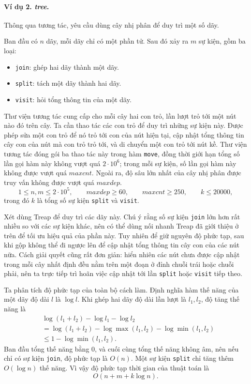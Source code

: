 \documentclass[11pt]{article}
\begin{document}
\paragraph{Ví dụ 2. \emph{tree}.}
Thông qua tương tác, yêu cầu dùng cây nhị phân để duy trì một số dãy.

Ban đầu có \(n\) dãy, mỗi dãy chỉ có một phần tử. Sau đó xảy ra \(m\) sự kiện,
gồm ba loại:

\begin{itemize}
  \item \texttt{join}: ghép hai dãy thành một dãy.
  \item \texttt{split}: tách một dãy thành hai dãy.
  \item \texttt{visit}: hỏi tổng thông tin của một dãy.
\end{itemize}

Thư viện tương tác cung cấp cho mỗi cây hai con trỏ, lần lượt trỏ tới một nút
nào đó trên cây. Ta cần thao tác các con trỏ để duy trì những sự kiện này. Được
phép sửa một con trỏ để nó trỏ tới con của nút hiện tại, cập nhật tổng thông
tin cây con của nút mà con trỏ trỏ tới, và di chuyển một con trỏ tới nút kề.
Thư viện tương tác đóng gói ba thao tác này trong hàm \texttt{move}, đồng thời
giới hạn tổng số lần gọi hàm này không vượt quá \(2\cdot 10^6\); trong mỗi sự
kiện, số lần gọi hàm này không được vượt quá \(\textit{maxcnt}\). Ngoài ra,
độ sâu lớn nhất của cây nhị phân được truy vấn không được vượt quá
\(\textit{maxdep}\).
\[
  1\le n,m\le 2\cdot 10^5,\qquad
  \textit{maxdep}\ge 60,\qquad
  \textit{maxcnt}\ge 250,\qquad
  k\le 20000,
\]
trong đó \(k\) là tổng số sự kiện \texttt{split} và \texttt{visit}.

Xét dùng Treap để duy trì các dãy này. Chú ý rằng số sự kiện \texttt{join} lớn
hơn rất nhiều so với các sự kiện khác, nên có thể dùng nối nhanh Treap đã giới
thiệu ở trên để tối ưu hiệu quả của phần này. Tuy nhiên để giữ nguyên độ phức
tạp, sau khi gộp không thể đi ngược lên để cập nhật tổng thông tin cây con của
các nút nữa. Cách giải quyết cũng rất đơn giản: hiển nhiên các nút chưa được
cập nhật trong mỗi cây nhất định đều nằm trên một đoạn ở đỉnh chuỗi trái hoặc
chuỗi phải, nên ta trực tiếp trì hoãn việc cập nhật tới lần \texttt{split} hoặc
\texttt{visit} tiếp theo.

Ta phân tích độ phức tạp của toàn bộ cách làm. Định nghĩa hàm thế năng của một
dãy độ dài \(l\) là \(\log l\). Khi ghép hai dãy độ dài lần lượt là \(l_1,l_2\),
độ tăng thế năng là
\[
\begin{aligned}
  &\log(l_1+l_2)-\log l_1-\log l_2\\
  &=\log(l_1+l_2)-\log\max(l_1,l_2)-\log\min(l_1,l_2)\\
  &\le 1-\log\min(l_1,l_2).
\end{aligned}
\]
Ban đầu tổng thế năng bằng \(0\), và cuối cùng tổng thế năng không âm, nên nếu
chỉ có sự kiện \texttt{join}, độ phức tạp là \(O(n)\). Một sự kiện
\texttt{split} chỉ tăng thêm \(O(\log n)\) thế năng. Vì vậy độ phức tạp thời
gian của thuật toán là
\[
  O(n+m+k\log n).
\]
\end{document}
